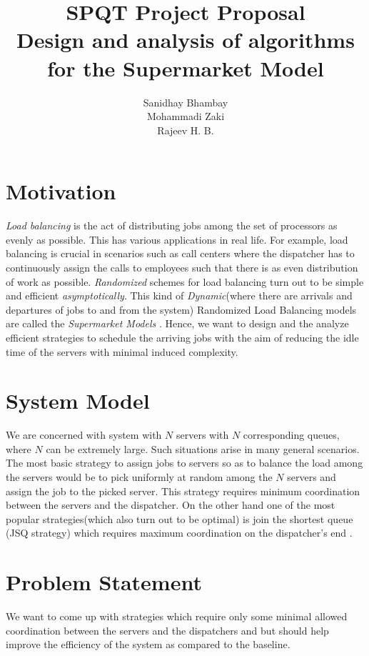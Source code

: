 \documentclass[a4paper,english,11pt]{article}
\title{\textbf{SPQT Project Proposal\\Design and analysis of algorithms for the Supermarket Model}}
\author{Sanidhay Bhambay \\ Mohammadi Zaki \\ Rajeev H. B.}
\begin{document}
\maketitle
\section{Motivation}
\textit{Load balancing} is the act of distributing jobs among the set of processors as evenly as possible. This has various applications in real life. For example, load balancing is crucial in scenarios such as call centers where the dispatcher has to continuously assign the calls to  employees such that there is as even distribution of work as possible. \textit{Randomized} schemes for load balancing turn out to be simple and efficient \textit{asymptotically}. This kind of \textit{Dynamic}(where there are arrivals and departures of jobs to and from the system) Randomized Load Balancing models are called the \textit{Supermarket Models} \cite{Balaji}. Hence, we want to design and the analyze efficient strategies to schedule the arriving jobs with the aim of reducing the idle time of the servers with minimal induced complexity.      
\section{System Model}
We are concerned with system with $N$ servers with $N$ corresponding queues, where $N$ can be extremely large. Such situations arise in many general scenarios. The most basic strategy to assign jobs to servers so as to balance the load among the servers would be to pick uniformly at random among the $N$ servers and assign the job to the picked server. This strategy requires minimum coordination between the servers and the dispatcher. On the other hand one of the most popular strategies(which also turn out to be optimal) is join the shortest queue (JSQ strategy) which requires maximum coordination on the dispatcher's end \cite{Mitzenmacher}.  
\section{Problem Statement}
We want to come up with strategies which  require only some  minimal allowed  coordination between the servers and the dispatchers and but should help improve the efficiency of the system as compared to the baseline.
\end{document}
